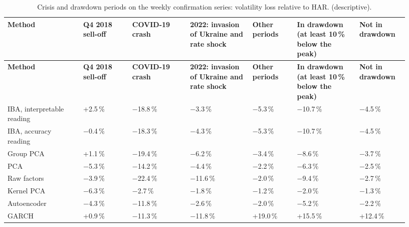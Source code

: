 {\scriptsize\setlength{\tabcolsep}{4pt}\renewcommand{\arraystretch}{1.2}
\begin{longtable}{@{}>{\raggedright\arraybackslash}p{0.173\linewidth}>{\raggedright\arraybackslash}p{0.116\linewidth}>{\raggedright\arraybackslash}p{0.137\linewidth}>{\raggedright\arraybackslash}p{0.143\linewidth}>{\raggedleft\arraybackslash}p{0.103\linewidth}>{\raggedright\arraybackslash}p{0.144\linewidth}>{\raggedright\arraybackslash}p{0.115\linewidth}@{}}
\caption{Crisis and drawdown periods on the weekly confirmation series: volatility loss relative to HAR. (descriptive).}\label{tab:E4}\\
\toprule
\textbf{Method} & \textbf{Q4 2018 sell-off} & \textbf{COVID-19 crash} & \textbf{2022: invasion of Ukraine and rate shock} & \textbf{Other periods} & \textbf{In drawdown (at least 10\,\% below the peak)} & \textbf{Not in drawdown} \\
\midrule
\endfirsthead
\toprule
\textbf{Method} & \textbf{Q4 2018 sell-off} & \textbf{COVID-19 crash} & \textbf{2022: invasion of Ukraine and rate shock} & \textbf{Other periods} & \textbf{In drawdown (at least 10\,\% below the peak)} & \textbf{Not in drawdown} \\
\midrule
\endhead
\bottomrule
\endlastfoot
IBA, interpretable reading & +2.5\,\% & \ensuremath{-}18.8\,\% & \ensuremath{-}3.3\,\% & \ensuremath{-}5.3\,\% & \ensuremath{-}10.7\,\% & \ensuremath{-}4.5\,\% \\
IBA, accuracy reading & \ensuremath{-}0.4\,\% & \ensuremath{-}18.3\,\% & \ensuremath{-}4.3\,\% & \ensuremath{-}5.3\,\% & \ensuremath{-}10.7\,\% & \ensuremath{-}4.5\,\% \\
Group PCA & +1.1\,\% & \ensuremath{-}19.4\,\% & \ensuremath{-}6.2\,\% & \ensuremath{-}3.4\,\% & \ensuremath{-}8.6\,\% & \ensuremath{-}3.7\,\% \\
PCA & \ensuremath{-}5.3\,\% & \ensuremath{-}14.2\,\% & \ensuremath{-}4.4\,\% & \ensuremath{-}2.2\,\% & \ensuremath{-}6.3\,\% & \ensuremath{-}2.5\,\% \\
Raw factors & \ensuremath{-}3.9\,\% & \ensuremath{-}22.4\,\% & \ensuremath{-}11.6\,\% & \ensuremath{-}2.0\,\% & \ensuremath{-}9.4\,\% & \ensuremath{-}2.7\,\% \\
Kernel PCA & \ensuremath{-}6.3\,\% & \ensuremath{-}2.7\,\% & \ensuremath{-}1.8\,\% & \ensuremath{-}1.2\,\% & \ensuremath{-}2.0\,\% & \ensuremath{-}1.3\,\% \\
Autoencoder & \ensuremath{-}4.3\,\% & \ensuremath{-}11.8\,\% & \ensuremath{-}2.6\,\% & \ensuremath{-}2.0\,\% & \ensuremath{-}5.2\,\% & \ensuremath{-}2.2\,\% \\
GARCH & +0.9\,\% & \ensuremath{-}11.3\,\% & \ensuremath{-}11.8\,\% & +19.0\,\% & +15.5\,\% & +12.4\,\% \\
\end{longtable}}
